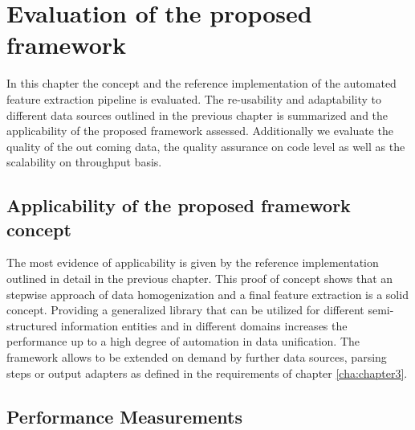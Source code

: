 \chapter{Evaluation of the proposed framework\label{cha:chapter6}}

In this chapter the concept and the reference implementation of the automated feature extraction pipeline is evaluated. The re-usability and adaptability to different data sources outlined in the previous chapter is summarized and the applicability of the proposed framework assessed. Additionally we evaluate the quality of the out coming data, the quality assurance on code level as well as the scalability on throughput basis. 

\section{Applicability of the proposed framework concept}

The most evidence of applicability is given by the reference implementation outlined in detail in the previous chapter. This proof of concept shows that an stepwise approach of data homogenization and a final feature extraction is a solid concept. Providing a generalized library that can be utilized for different semi-structured information entities and in different domains increases the performance up to a high degree of automation in data unification. The framework allows to be extended on demand by further data sources, parsing steps or output adapters as defined in the requirements of chapter \ref{cha:chapter3}.

\section{Performance Measurements\label{sec:performance}}

